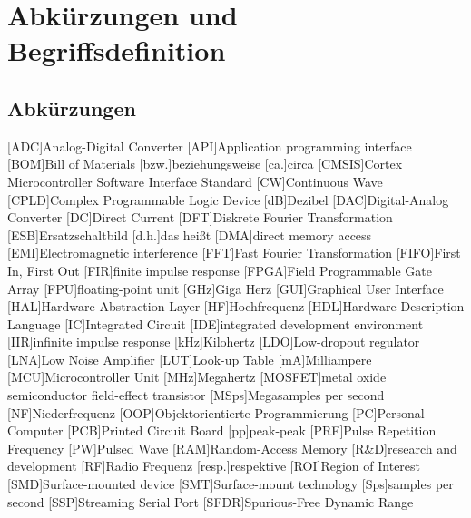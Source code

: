 \chapter{Abkürzungen und Begriffsdefinition}

\section{Abkürzungen} 
\begin{acronym}[mosfetmosfet]\itemsep0pt
[ADC]{Analog-Digital Converter}
[API]{Application programming interface}
[BOM]{Bill of Materials}
[bzw.]{beziehungsweise}
[ca.]{circa}
[CMSIS]{Cortex Microcontroller Software Interface Standard}
[CW]{Continuous Wave}
[CPLD]{Complex Programmable Logic Device}
[dB]{Dezibel}
[DAC]{Digital-Analog Converter}
[DC]{Direct Current}
[DFT]{Diskrete Fourier Transformation}
[ESB]{Ersatzschaltbild}
[d.h.]{das heißt}
[DMA]{direct memory access}
[EMI]{Electromagnetic interference}
[FFT]{Fast Fourier Transformation}
[FIFO]{First In, First Out}
[FIR]{finite impulse response}
[FPGA]{Field Programmable Gate Array}
[FPU]{floating-point unit}
[GHz]{Giga Herz}
[GUI]{Graphical User Interface}
[HAL]{Hardware Abstraction Layer}
[HF]{Hochfrequenz}
[HDL]{Hardware Description Language}
[IC]{Integrated Circuit}
[IDE]{integrated development environment}
[IIR]{infinite impulse response}
[kHz]{Kilohertz}
[LDO]{Low-dropout regulator}
[LNA]{Low Noise Amplifier}
[LUT]{Look-up Table}
[mA]{Milliampere}
[MCU]{Microcontroller Unit}
[MHz]{Megahertz}
[MOSFET]{metal oxide semiconductor field-effect transistor}
[MSps]{Megasamples per second}
[NF]{Niederfrequenz}
[OOP]{Objektorientierte Programmierung}
[PC]{Personal Computer}
[PCB]{Printed Circuit Board}
[pp]{peak-peak}
[PRF]{Pulse Repetition Frequency}
[PW]{Pulsed Wave}
[RAM]{Random-Access Memory}
[R\&D]{research and development}
[RF]{Radio Frequenz}
[resp.]{respektive}
[ROI]{Region of Interest}
[SMD]{Surface-mounted device}
[SMT]{Surface-mount technology}
[Sps]{samples per second}
[SSP]{Streaming Serial Port}
[SFDR]{Spurious-Free Dynamic Range}


\end{acronym}
